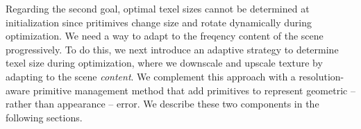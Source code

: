 

Regarding the second goal,
 optimal texel sizes cannot  be determined at initialization
since pritimives change size and rotate dynamically during optimization.
We need a way to adapt to the freqency content of the scene progressively. 
To do this, we next introduce an adaptive strategy to determine texel size during optimization, where we downscale and upscale texture by adapting to the scene \emph{content}. 
We complement this approach with a resolution-aware primitive management method that add primitives to represent geometric -- rather than appearance -- error.
We describe these two components in the following sections.



